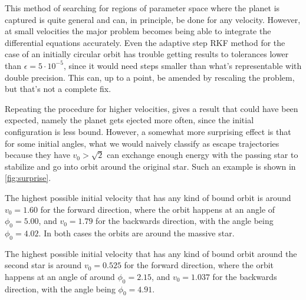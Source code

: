 \documentclass[10pt,a4paper,twocolumn]{article}
\begin{document}
This method of searching for regions of parameter space where the planet is captured is quite general and can, in principle, be done for any velocity. However, at small velocities the major problem becomes being able to integrate the differential equations accurately. Even the adaptive step RKF method for the case of an initially circular orbit has trouble getting results to tolerances lower than $\epsilon = 5 \cdot 10^{-5}$, since it would need steps smaller than what's representable with double precision. This can, up to a point, be amended by rescaling the problem, but that's not a complete fix.

Repeating the procedure for higher velocities, gives a result that could have been expected, namely the planet gets ejected more often, since the initial configuration is less bound. However, a somewhat more surprising effect is that for some initial angles, what we would naively classify as escape trajectories because they have $v_0 > \sqrt{2}$ can exchange enough energy with the passing star to stabilize and go into orbit around the original star. Such an example is shown in \cref{fig:surprise}.

The highest possible initial velocity that has any kind of bound orbit is around $v_0=1.60$ for the forward direction, where the orbit happens at an angle of $\phi_0=5.00$, and $v_0=1.79$ for the backwards direction, with the angle being $\phi_0 = 4.02$. In both cases the orbits are around the massive star.

The highest possible initial velocity that has any kind of bound orbit around the second star is around $v_0=0.525$ for the forward direction, where the orbit happens at an angle of around $\phi_0=2.15$, and $v_0=1.037$ for the backwards direction, with the angle being $\phi_0 = 4.91$.


\printbibliography
\end{document}
